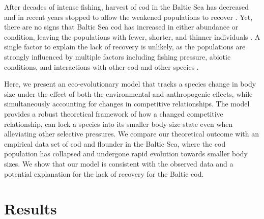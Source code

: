 \documentclass[9pt,twocolumn,twoside]{pnas-new}
\begin{document}
After decades of intense fishing, harvest of cod in the Baltic Sea has decreased and in recent years stopped to allow the weakened populations to recover \citep{ICES2022}. Yet, there are no signs that Baltic Sea cod has increased in either abundance or condition, leaving the populations with fewer, shorter, and thinner individuals \citep{ICES2022}. A single factor to explain the lack of recovery is unlikely, as the populations are strongly influenced by multiple factors including fishing pressure, abiotic conditions, and interactions with other cod and other species \citep{Ahti2020}. 

Here, we present an eco-evolutionary model that tracks a species change in body size under the effect of both the environmental and anthropogenic effects, while simultaneously accounting for changes in competitive relationships. The model provides a robust theoretical framework of how a changed competitive relationship, can lock a species into its smaller body size state even when alleviating other selective pressures. We compare our theoretical outcome with an empirical data set of cod and flounder in the Baltic Sea, where the cod population has collapsed and undergone rapid evolution towards smaller body sizes. We show that our model is consistent with the observed data and a potential explanation for the lack of recovery for the Baltic cod. 


\section*{Results}
\end{document}
